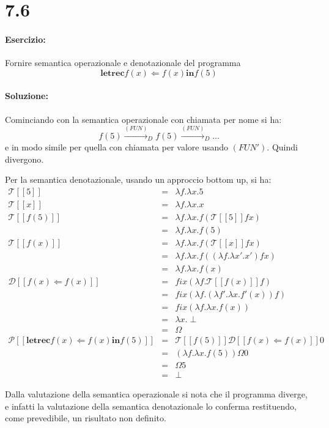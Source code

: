 \documentclass[a4paper,twosides]{report}
\begin{document}
\section*{7.6}
\paragraph{Esercizio:}
Fornire semantica operazionale e denotazionale del programma
$$
\mathbf{letrec} f(x) \Leftarrow f(x) \mathbf{in} f(5)  
$$

\paragraph{Soluzione:}
Cominciando con la semantica operazionale con chiamata per nome si ha:
$$
f(5) \xrightarrow{(FUN)}_D f(5) \xrightarrow{(FUN)}_D \dots
$$
e in modo simile per quella con chiamata per valore usando
$(FUN')$. Quindi divergono.

Per la semantica denotazionale, usando un approccio bottom up, si ha:
\begin{eqnarray*}
  \mathcal{T}[[5]]&=&\lambda f.\lambda x. 5\\
  \mathcal{T}[[x]]&=&\lambda f.\lambda x. x\\
  \mathcal{T}[[f(5)]]&=&\lambda f.\lambda x. f(\mathcal{T}[[5]]fx)\\
  &=&\lambda f.\lambda x.f(5)\\
  \mathcal{T}[[f(x)]]&=&\lambda f.\lambda x. f(\mathcal{T}[[x]]fx)\\
  &=&\lambda f.\lambda x.f((\lambda f.\lambda x'.x')fx)\\
  &=&\lambda f.\lambda x.f(x)\\
  \mathcal{D}[[f(x)\Leftarrow f(x)]]&=&fix(\lambda
  f.\mathcal{T}[[f(x)]]f)\\
  &=&fix(\lambda f.(\lambda f'.\lambda x.f'(x))f)\\
  &=&fix(\lambda f.\lambda x. f(x))\\
  &=&\lambda x.\perp\\
  &=&\Omega\\
  \mathcal{P}[[\mathbf{letrec} f(x) \Leftarrow f(x) \mathbf{in} f(5)
  ]]&=&\mathcal{T}[[f(5)]]\mathcal{D}[[f(x)\Leftarrow f(x)]]0\\
  &=&(\lambda f.\lambda x.f(5))\Omega 0\\
  &=&\Omega 5\\
  &=&\perp
\end{eqnarray*}

Dalla valutazione della semantica operazionale si nota che il
programma diverge, e infatti
la valutazione della semantica denotazionale lo conferma restituendo, come
prevedibile, un risultato non definito.
\end{document}
